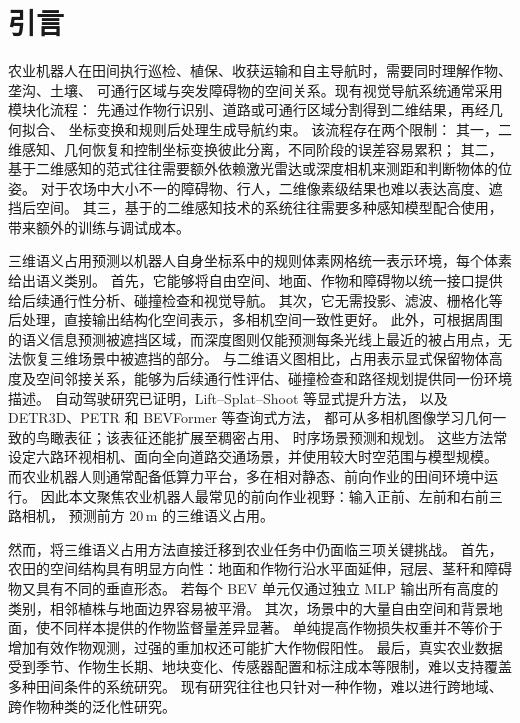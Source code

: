 \documentclass[a4paper,fleqn]{cas-sc}
\begin{document}

\section{引言}\label{sec:intro}
 
农业机器人在田间执行巡检、植保、收获运输和自主导航时，需要同时理解作物、垄沟、土壤、
可通行区域与突发障碍物的空间关系。现有视觉导航系统通常采用模块化流程：
先通过作物行识别、道路或可通行区域分割得到二维结果，再经几何拟合、
坐标变换和规则后处理生成导航约束\citep{nkwochaComprehensiveReviewSensing2025,baiVisionbasedNavigationGuidance2023}。
该流程存在两个限制：
其一，二维感知、几何恢复和控制坐标变换彼此分离，不同阶段的误差容易累积；
其二，基于二维感知的范式往往需要额外依赖激光雷达或深度相机来测距和判断物体的位姿。
对于农场中大小不一的障碍物、行人，二维像素级结果也难以表达高度、遮挡后空间。
其三，基于的二维感知技术的系统往往需要多种感知模型配合使用，带来额外的训练与调试成本。

三维语义占用预测以机器人自身坐标系中的规则体素网格统一表示环境，每个体素给出语义类别。
首先，它能够将自由空间、地面、作物和障碍物以统一接口提供给后续通行性分析、碰撞检查和视觉导航。
其次，它无需投影、滤波、栅格化等后处理，直接输出结构化空间表示，多相机空间一致性更好。
此外，可根据周围的语义信息预测被遮挡区域，而深度图则仅能预测每条光线上最近的被占用点，无法恢复三维场景中被遮挡的部分。
与二维语义图相比，占用表示显式保留物体高度及空间邻接关系，能够为后续通行性评估、碰撞检查和路径规划提供同一份环境描述。
自动驾驶研究已证明，Lift--Splat--Shoot 等显式提升方法\citep{philion2020lift,huang2021bevdet,li2022bevdepth}，
以及 DETR3D、PETR 和 BEVFormer 等查询式方法\citep{wang2022detr3d,li2022petr,li2022bevformer}，
都可从多相机图像学习几何一致的鸟瞰表征；该表征还能扩展至稠密占用\citep{wei2023surroundocc,wang2023openoccupancy}、
时序场景预测和规划\citep{zheng2024occworld,mei2025irwm}。
这些方法常设定六路环视相机、面向全向道路交通场景，并使用较大时空范围与模型规模。
而农业机器人则通常配备低算力平台，多在相对静态、前向作业的田间环境中运行。
因此本文聚焦农业机器人最常见的前向作业视野：输入正前、左前和右前三路相机，
预测前方 $20\,$m 的三维语义占用。

然而，将三维语义占用方法直接迁移到农业任务中仍面临三项关键挑战。
首先，农田的空间结构具有明显方向性：地面和作物行沿水平面延伸，冠层、茎秆和障碍物又具有不同的垂直形态。
若每个 BEV 单元仅通过独立 MLP 输出所有高度的类别，相邻植株与地面边界容易被平滑。
其次，场景中的大量自由空间和背景地面，使不同样本提供的作物监督量差异显著。
单纯提高作物损失权重并不等价于增加有效作物观测，过强的重加权还可能扩大作物假阳性。
最后，真实农业数据受到季节、作物生长期、地块变化、传感器配置和标注成本等限制，难以支持覆盖多种田间条件的系统研究。
现有研究往往也只针对一种作物，难以进行跨地域、跨作物种类的泛化性研究。
\end{document}
